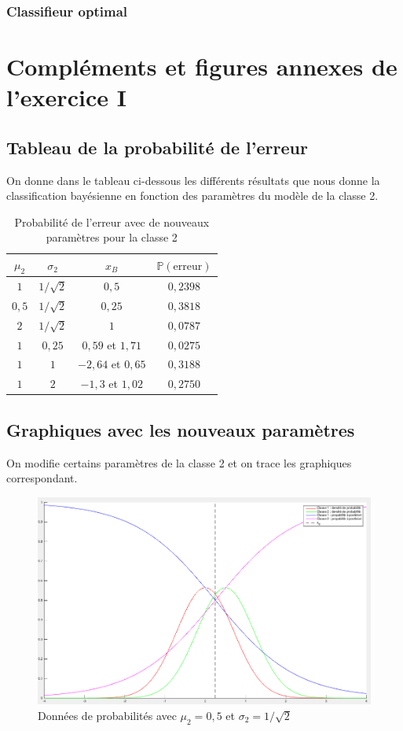 \documentclass[11pt,a4paper]{article}
\begin{document}
\subsubsection{Classifieur optimal}

\newpage
\appendix
\section{Compléments et figures annexes de l'exercice I}
\subsection{Tableau de la probabilité de l'erreur}

On donne dans le tableau ci-dessous les différents résultats que nous donne la classification bayésienne en fonction des paramètres du modèle de la classe 2.
\begin{table}[H]
\center
\begin{tabular}{|c|c|c|c|}
\hline 
$\mu_2$ & $\sigma_2$ & $x_B$ & $\mathbb{P}(\text{erreur})$ \\ 
\hline 
$1$ & $1/ \sqrt{2}$ & $0,5$ & $0,2398$ \\ 
\hline 
$0,5$ & $1/ \sqrt{2}$ & $0,25$ & $0,3818$ \\ 
\hline 
$2$ & $1/ \sqrt{2}$ & $1$ & $0,0787$ \\ 
\hline 
$1$ & $0,25$ & $0,59$ et $1,71$ & $0,0275$ \\ 
\hline 
$1$ & $1$ & $-2,64$ et $0,65$ & $0,3188$ \\ 
\hline 
$1$ & $2$ & $-1,3$ et $1,02$ & $0,2750$ \\ 
\hline 
\end{tabular}
\caption{Probabilité de l'erreur avec de nouveaux paramètres pour la classe 2}

\end{table}


\subsection{Graphiques avec les nouveaux paramètres}
On modifie certains paramètres de la classe 2 et on trace les graphiques correspondant.

\begin{figure}[H]
\center
\includegraphics[width=14cm]{exo1_graph_mu05.png}
\caption{Données de probabilités avec $\mu_2 = 0,5$ et $\sigma_2 = 1/\sqrt{2}$}
\end{figure}
\end{document}
